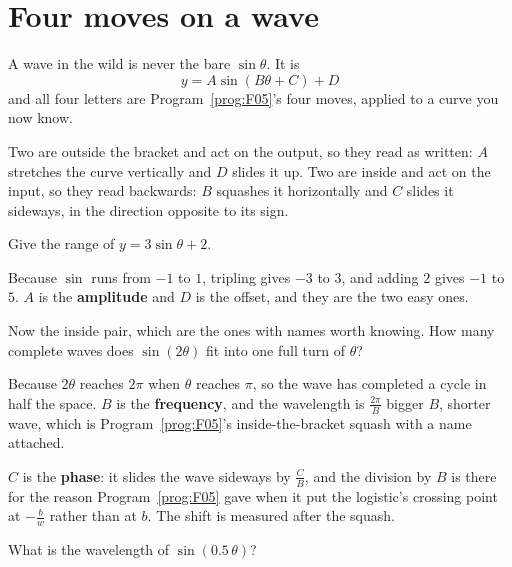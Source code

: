 \section{Four moves on a wave}
\label{sec:F08-moves}

\begin{fr}
A wave in the wild is never the bare $\sin\theta$. It is
\[ y = A\sin(B\theta + C) + D \]
and all four letters are Program~\ref{prog:F05}'s four moves, applied to a
curve you now know.

Two are outside the bracket and act on the output, so they read as written:
$A$ stretches the curve vertically and $D$ slides it up. Two are inside and
act on the input, so they read backwards: $B$ squashes it horizontally and $C$
slides it sideways, in the direction opposite to its sign.

Give the range of $y = 3\sin\theta + 2$.
\nextframe
\end{fr}

\begin{fr}
Because $\sin$ runs from $-1$ to $1$, tripling gives $-3$ to $3$, and adding
$2$ gives $-1$ to $5$. $A$ is the \textbf{amplitude} and $D$ is the offset,
and they are the two easy ones.

Now the inside pair, which are the ones with names worth knowing. How many
complete waves does $\sin(2\theta)$ fit into one full turn of $\theta$?
\nextframe
\end{fr}

\begin{fr}
Because $2\theta$ reaches $2\pi$ when $\theta$ reaches $\pi$, so the wave has
completed a cycle in half the space. $B$ is the \textbf{frequency}, and the
wavelength is $\frac{2\pi}{B}$ \dash{} bigger $B$, shorter wave, which is
Program~\ref{prog:F05}'s inside-the-bracket squash with a name attached.

$C$ is the \textbf{phase}: it slides the wave sideways by $\frac{C}{B}$, and
the division by $B$ is there for the reason Program~\ref{prog:F05} gave when
it put the logistic's crossing point at $-\frac{b}{w}$ rather than at $b$. The
shift is measured after the squash.

What is the wavelength of $\sin(\num{0.5}\,\theta)$?
\nextframe
\end{fr}

